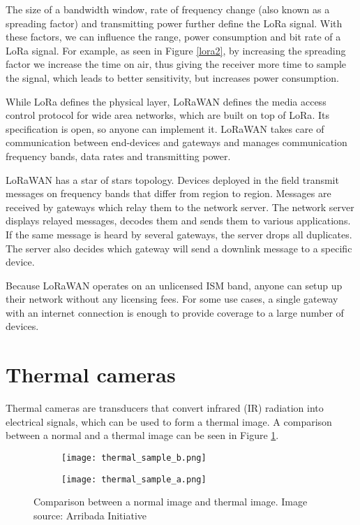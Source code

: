 The size of a bandwidth window, rate of frequency change (also known as a spreading factor) and transmitting power further define the LoRa signal.
With these factors, we can influence the range, power consumption and bit rate of a LoRa signal.
For example, as seen in Figure \ref{lora2}, by increasing the spreading factor we increase the time on air, thus giving the receiver more time to sample the signal, which leads to better sensitivity, but increases power consumption.

While LoRa defines the physical layer, LoRaWAN defines the media access control protocol for wide area networks, which are built on top of LoRa\cite{lora_article}.
Its specification is open, so anyone can implement it.
LoRaWAN takes care of communication between end-devices and gateways and manages communication frequency bands, data rates and transmitting power.

LoRaWAN has a star of stars topology\cite{lora_article}.
Devices deployed in the field transmit messages on frequency bands that differ from region to region. 
Messages are received by gateways which relay them to the network server.
The network server displays relayed messages, decodes them and sends them to various applications.
If the same message is heard by several gateways, the server drops all duplicates.
The server also decides which gateway will send a downlink message to a specific device. 

Because LoRaWAN operates on an unlicensed ISM band, anyone can setup up their network without any licensing fees.
For some use cases, a single gateway with an internet connection is enough to provide coverage to a large number of devices.


\section{ Thermal cameras} \label{thermal_cameras}

Thermal cameras are transducers that convert infrared (IR) radiation into electrical signals, which can be used to form a thermal image.
A comparison between a normal and a thermal image can be seen in Figure \ref{thermal_comparison}.
\newline 

\begin{figure}[ht]
    \begin{subfigure}{0.5\textwidth}
        \centering
        \texttt{[image: thermal\_sample\_b.png]} 
    \end{subfigure}
    \begin{subfigure}{0.5\textwidth}
        \centering
        \texttt{[image: thermal\_sample\_a.png]}
    \end{subfigure}
    \caption[Comparison between a normal image and thermal image]{Comparison between a normal image and thermal image. Image source: Arribada Initiative\cite{thermal_comparison}}
    \label{thermal_comparison}
\end{figure}

